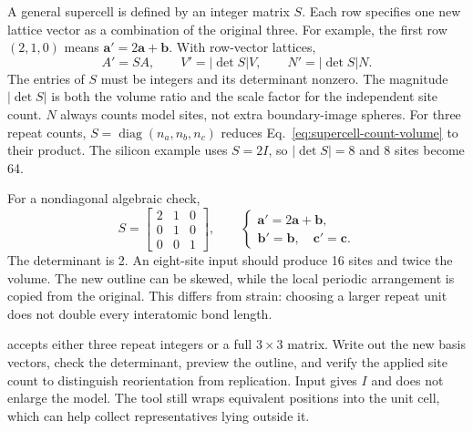 A general supercell is defined by an integer matrix $S$. Each row specifies one new lattice vector as a combination of the original three. For example, the first row $(2,1,0)$ means $\mathbf a'=2\mathbf a+\mathbf b$. With row-vector lattices,
\begin{equation}
 A'=SA,\qquad V'=|\det S|V,\qquad N'=|\det S|N.
 \label{eq:supercell-count-volume}
\end{equation}
The entries of $S$ must be integers and its determinant nonzero. The magnitude $|\det S|$ is both the volume ratio and the scale factor for the independent site count. $N$ always counts model sites, not extra boundary-image spheres. For three repeat counts, $S=\operatorname{diag}(n_a,n_b,n_c)$ reduces Eq.~\eqref{eq:supercell-count-volume} to their product. The silicon example uses $S=2I$, so $|\det S|=8$ and 8 sites become 64.

For a nondiagonal algebraic check,
\[
 S=\begin{bmatrix}2&1&0\\0&1&0\\0&0&1\end{bmatrix},\qquad
 \begin{cases}
 \mathbf a'=2\mathbf a+\mathbf b,\\
 \mathbf b'=\mathbf b,\quad \mathbf c'=\mathbf c.
 \end{cases}
\]
The determinant is 2. An eight-site input should produce 16 sites and twice the volume. The new outline can be skewed, while the local periodic arrangement is copied from the original. This differs from strain: choosing a larger repeat unit does not double every interatomic bond length.

 accepts either three repeat integers or a full $3\times3$ matrix. Write out the new basis vectors, check the determinant, preview the outline, and verify the applied site count to distinguish reorientation from replication. Input  gives $I$ and does not enlarge the model. The tool still wraps equivalent positions into the unit cell, which can help collect representatives lying outside it.
